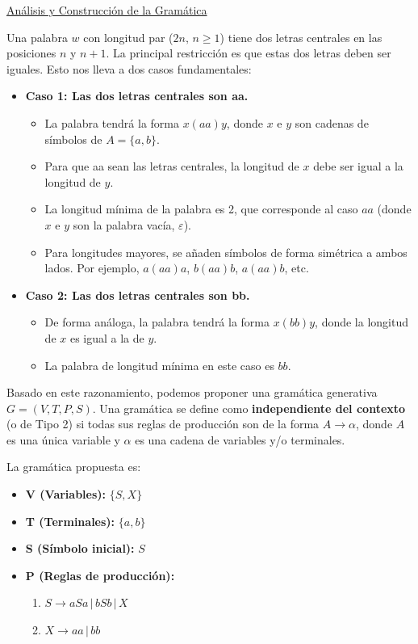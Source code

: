 \documentclass[12pt]{report} %
\begin{document}
\begin{ejercicio}
\begin{enumerate}[label=\alph*)]
\begin{solucion}
    \underline{Análisis y Construcción de la Gramática}

    Una palabra \( w \) con longitud par (\( 2n, \, n \geq 1 \)) tiene dos letras centrales en las posiciones \( n \) y \( n+1 \). La principal restricción es que estas dos letras deben ser iguales. Esto nos lleva a dos casos fundamentales:

    \begin{itemize}
        \item \textbf{Caso 1: Las dos letras centrales son aa.}
        \begin{itemize}
            \item La palabra tendrá la forma \( x(aa)y \), donde \( x \) e \( y \) son cadenas de símbolos de \( A = \{a, b\} \).
            \item Para que aa sean las letras centrales, la longitud de \( x \) debe ser igual a la longitud de \( y \).
            \item La longitud mínima de la palabra es 2, que corresponde al caso \( aa \) (donde \( x \) e \( y \) son la palabra vacía, \( \varepsilon \)).
            \item Para longitudes mayores, se añaden símbolos de forma simétrica a ambos lados. Por ejemplo, \( a(aa)a \), \( b(aa)b \), \( a(aa)b \), etc.
        \end{itemize}
        \item \textbf{Caso 2: Las dos letras centrales son bb.}
        \begin{itemize}
            \item De forma análoga, la palabra tendrá la forma \( x(bb)y \), donde la longitud de \( x \) es igual a la de \( y \).
            \item La palabra de longitud mínima en este caso es \( bb \).
        \end{itemize}
    \end{itemize}

    Basado en este razonamiento, podemos proponer una gramática generativa \( G = (V, T, P, S) \). Una gramática se define como \textbf{independiente del contexto} (o de Tipo 2) si todas sus reglas de producción son de la forma \( A \to \alpha \), donde \( A \) es una única variable y \( \alpha \) es una cadena de variables y/o terminales.

    La gramática propuesta es:
    \begin{itemize}
        \item \textbf{V (Variables):} \( \{S, X\} \)
        \item \textbf{T (Terminales):} \( \{a, b\} \)
        \item \textbf{S (Símbolo inicial):} \( S \)
        \item \textbf{P (Reglas de producción):}
        \begin{enumerate}
            \item \( S \to aSa \, | \, bSb \, | \, X \)
            \item \( X \to aa \, | \, bb \)
        \end{enumerate}
    \end{itemize}


\end{solucion}
\end{enumerate}
\end{ejercicio}
\end{document}
